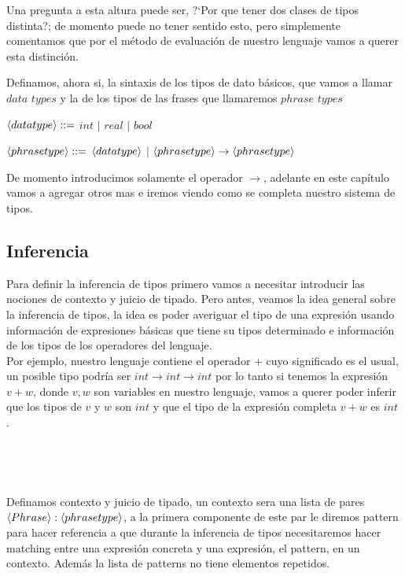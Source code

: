 Una pregunta a esta altura puede ser, ?`Por que tener dos clases de tipos 
distinta?; de momento puede no tener sentido esto, pero simplemente
comentamos que por el m\'etodo de evaluaci\'on de nuestro lenguaje
vamos a querer esta distinci\'on.\

Definamos, ahora si, la sintaxis de los tipos de dato b\'asicos, 
que vamos a llamar $data$ $types$ y la de los tipos de las frases que
llamaremos $phrase$ $types$ 

\begin{center} $\langle data type \rangle ::=$ $int$ $|$ $real$ $|$ $bool$ \end{center}

\begin{center} 

$\langle phrase type \rangle::=$ $\langle data type \rangle$ $|$ $\langle phrase type \rangle \rightarrow \langle phrase type \rangle$

\end{center}

De momento introducimos solamente el operador $\rightarrow$, adelante en este 
cap\'itulo vamos a agregar otros mas e iremos viendo como se completa nuestro
sistema de tipos.\

\subsection{Inferencia}
Para definir la inferencia de tipos primero vamos a necesitar introducir las 
nociones de contexto y juicio de tipado. Pero antes, veamos la idea general
sobre la inferencia de tipos, la idea es poder averiguar el tipo de una expresi\'on
usando informaci\'on de expresiones b\'asicas que tiene su tipos determinado e
informaci\'on de los tipos de los operadores del lenguaje.\\
Por ejemplo, nuestro lenguaje contiene el operador $+$ cuyo significado
es el usual, un posible tipo podr\'ia ser $int \rightarrow int \rightarrow int$
por lo tanto si tenemos la expresi\'on $v + w$, donde $v,w$ son variables en
nuestro lenguaje, vamos a querer poder inferir que los tipos de $v$ y $w$ son
$int$ y que el tipo de la expresi\'on completa $v + w$ es $int$.\

\

\

\noindent Definamos contexto y juicio de tipado, un contexto sera una lista de 
pares $\langle Phrase \rangle:\langle phrase type \rangle$, a la primera componente de este 
par le diremos pattern para hacer referencia a que durante la inferencia de tipos
necesitaremos hacer matching entre una expresi\'on concreta y una expresi\'on, el
pattern, en un contexto. Adem\'as la lista de patterns no tiene elementos repetidos.

